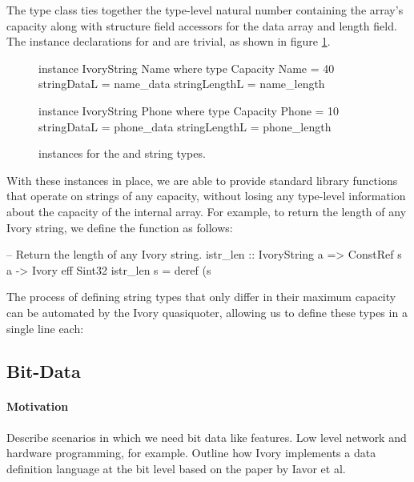 The  type class ties together the type-level natural
number containing the array's capacity along with structure field accessors
for the data array and length field. The instance declarations for 
and  are trivial, as shown in figure \ref{ivory-string-instances}.

\begin{figure}[h]
\begin{code}
instance IvoryString Name where
  type Capacity Name = 40
  stringDataL = name_data
  stringLengthL = name_length

instance IvoryString Phone where
  type Capacity Phone = 10
  stringDataL = phone_data
  stringLengthL = phone_length
\end{code}
\caption{ instances for the  and 
string types.}
\label{ivory-string-instances}
\end{figure}

With these instances in place, we are able to provide standard library
functions that operate on strings of any capacity, without losing any
type-level information about the capacity of the internal array. For
example, to return the length of any Ivory string, we define the
 function as follows:

\begin{code}
-- Return the length of any Ivory string.
istr_len :: IvoryString a
         => ConstRef s a -> Ivory eff Sint32
istr_len s = deref (s %
\end{code}

The process of defining string types that only differ
in their maximum capacity can be automated by the Ivory quasiquoter,
allowing us to define these types in a single line each:

\begin{code}
\end{code}

\subsection{Bit-Data}

\paragraph{Motivation}
Describe scenarios in which we need bit data like features. Low level network
and hardware programming, for example. Outline how Ivory implements a data
definition language at the bit level based on the paper by Iavor et al.

